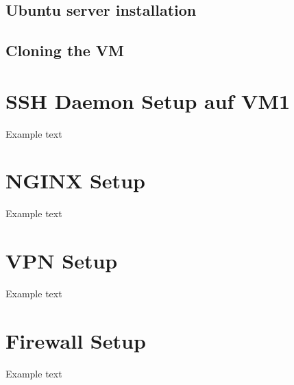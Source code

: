 \documentclass[10pt,a4paper]{article}
\begin{document}
\subsection{Ubuntu server installation}

\subsection{Cloning the VM}

\newpage
\section{SSH Daemon Setup auf VM1}
Example text

\newpage
\section{NGINX Setup}
Example text

\newpage
\section{VPN Setup}
Example text

\newpage
\section{Firewall Setup}
Example text
\end{document}
